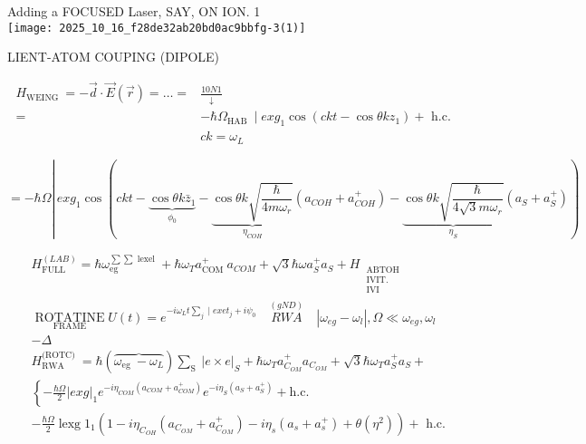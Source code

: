 Adding a FOCUSED Laser, SAY, ON ION. 1\\
\texttt{[image: 2025\_10\_16\_f28de32ab20bd0ac9bbfg-3(1)]}

LIENT-ATOM COUPING (DIPOLE)

$$
\begin{aligned}
H_{\text {WEING }}=-\vec{d} \cdot \vec{E}(\vec{r})=\ldots= & \frac{10 N 1}{\downarrow} \\
= & -\hbar \Omega_{\text {HAB }} \mid e x g_{1} \cos \left(c k t-\cos \theta k z_{1}\right)+\text { h.c. } \\
& c k=\omega_{L}
\end{aligned}
$$

$$
=-\hbar \Omega \left\lvert\, e x g_{1} \cos (c k t-\underbrace{\cos \theta k \bar{z}_{1}}_{\phi_{0}}-\underbrace{\cos \theta k \sqrt{\frac{\hbar}{4 m \omega_{r}}}}_{\eta_{C O H}}\left(a_{C OH}+a_{C OH}^{+}\right)-\underbrace{\cos \theta k \sqrt{\frac{\hbar}{4 \sqrt{3} m \omega_{r}}}}_{\eta_{S}}\left(a_{S}+a_{S}^{+}\right))\right.
$$

$$
\begin{aligned}
& H_{\text {FULL }}^{(L A B)}=\hbar \omega_{\text {eg }}^{\sum \sum \text { lexel }}+\hbar \omega_{T} a_{\text {COM }}^{+} a_{C O M}+\sqrt{3} \hbar \omega a_{S}^{+} a_{S}+H_{\substack{\text { ABTOH } \\
\text { IVIT. } \\
\text { IVI }}} \\
& \underset{\text { FRAME }}{\operatorname{ROTATINE}} U(t)=e^{-i \omega_{L} t \sum_{j} \mid e x e t_{j}+i \psi_{0}} \quad \stackrel{(g N D)}{R W A} \quad\left|\omega_{e g}-\omega_{l}\right|, \Omega \ll \omega_{e g}, \omega_{l} \\
& -\Delta \\
& H_{\text {RWA }}^{\text {(ROTC) }}=\hbar(\overbrace{\omega_{\text {eg }}-\omega_{L}}) \sum_{\text {S }}|e \times e|_{S}+\hbar \omega_{T} a_{C_{O M}}^{+} a_{C_{O M}}+\sqrt{3} \hbar \omega_{T} a_{S}^{+} a_{S}+ \\
& \left\{-\frac{\hbar \Omega}{2}|e x g|_{1} e^{-i \eta_{C O M}\left(a_{C O M}+a_{C O M}^{+}\right)} e^{-i \eta_{S}\left(a_{S}+a_{S}^{+}\right)}+\right.\text {h.c. } \\
& -\frac{\hbar \Omega}{2} \operatorname{lexg} 1_{1}\left(1-i \eta_{C_{O H}}\left(a_{C_{O M}}+a_{C_{O M}}^{+}\right)-i \eta_{s}\left(a_{s}+a_{s}^{+}\right)+\theta\left(\eta^{2}\right)\right)+\text { h.c. }
\end{aligned}
$$

